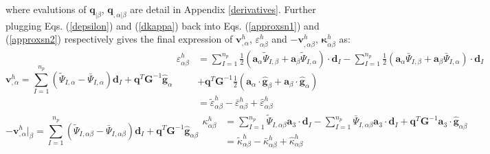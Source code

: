 where evalutions of $\boldsymbol q_{\vert \beta}$, $\boldsymbol q_{,\alpha\vert\beta}$ are detail in Appendix \ref{derivatives}. Further plugging Eqs. (\ref{depsilon}) and (\ref{dkappa}) back into Eqs. (\ref{approxsn1}) and (\ref{approxsn2}) respectively gives the final expression of $\boldsymbol v^h_{,\alpha}$, $\varepsilon^h_{\alpha\beta}$ and $-\boldsymbol v^h_{,\alpha\beta}$, $\boldsymbol \kappa^h_{\alpha\beta}$ as: \begin{subequations}
\begin{equation}
\boldsymbol v^h_{,\alpha} = \sum_{I=1}^{n_p}(
\tilde \Psi_{I,\alpha} - \bar \Psi_{I,\alpha}) \boldsymbol d_I +
\boldsymbol q^T \boldsymbol G^{-1}\hat{\boldsymbol g}_{\alpha}
\end{equation}
\begin{equation}\label{epsilonh}
\begin{split}
\varepsilon^h_{\alpha\beta} &= 
\sum_{I=1}^{n_p} \frac{1}{2}(\boldsymbol a_\alpha \tilde \Psi_{I,\beta} + \boldsymbol a_\beta \tilde \Psi_{I,\alpha}) \cdot \boldsymbol d_I 
- \sum_{I=1}^{n_p} \frac{1}{2}(\boldsymbol a_\alpha \bar \Psi_{I,\beta} + \boldsymbol a_\beta \bar \Psi_{I,\alpha}) \cdot \boldsymbol d_I \\
&+ \boldsymbol q^T \boldsymbol G^{-1} \frac{1}{2}(\boldsymbol a_\alpha \cdot \hat{\boldsymbol g}_{\beta} + \boldsymbol a_\beta \cdot \hat{\boldsymbol g}_{\alpha}) \\
&= \tilde \varepsilon^h_{\alpha\beta} - \bar \varepsilon^h_{\alpha\beta} + \hat \varepsilon^h_{\alpha\beta}
\end{split}
\end{equation}
\end{subequations}
\begin{subequations}
\begin{equation}
-\boldsymbol v^h_{,\alpha}\vert_\beta = \sum_{I=1}^{n_p} (
\tilde \Psi_{I,\alpha\beta} -
\bar \Psi_{I,\alpha\beta} ) \boldsymbol d_I +
\boldsymbol q^T \boldsymbol G^{-1}\hat{\boldsymbol g}_{\alpha\beta}
\end{equation}
\begin{equation}\label{kappah}
\begin{split}
\kappa^h_{\alpha\beta} &= \sum_{I=1}^{n_p} \tilde \Psi_{I,\alpha\beta} \boldsymbol a_3 \cdot \boldsymbol d_I
- \sum_{I=1}^{n_p} \bar \Psi_{I,\alpha\beta} \boldsymbol a_3 \cdot \boldsymbol d_I +
\boldsymbol q^T \boldsymbol G^{-1}\boldsymbol a_3 \cdot \hat{\boldsymbol g}_{\alpha\beta} \\
&= \tilde \kappa^h_{\alpha\beta} - \bar \kappa^h_{\alpha\beta} + \hat \kappa^h_{\alpha\beta}
\end{split}
\end{equation}
\end{subequations}

